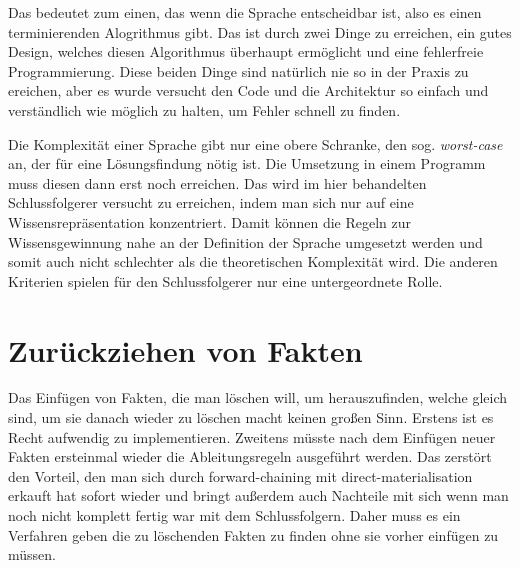 Das bedeutet zum einen, das wenn die Sprache entscheidbar ist, also es einen terminierenden Alogrithmus gibt. Das ist durch zwei Dinge zu erreichen, ein gutes Design, welches diesen Algorithmus überhaupt ermöglicht und eine fehlerfreie Programmierung. Diese beiden Dinge sind natürlich nie so in der Praxis zu ereichen, aber es wurde versucht den Code und die Architektur so einfach und verständlich wie möglich zu halten, um Fehler schnell zu finden.

Die Komplexität einer Sprache gibt nur eine obere Schranke, den sog. \emph{worst-case} an, der für eine Lösungsfindung nötig ist. Die Umsetzung in einem Programm muss diesen dann erst noch erreichen. Das wird im hier behandelten Schlussfolgerer versucht zu erreichen, indem man sich nur auf eine Wissensrepräsentation konzentriert. Damit können die Regeln zur Wissensgewinnung nahe an der Definition der Sprache umgesetzt werden und somit auch nicht schlechter als die theoretischen Komplexität wird.
Die anderen Kriterien spielen für den Schlussfolgerer nur eine untergeordnete Rolle.





\section{Zurückziehen von Fakten}
Das Einfügen von Fakten, die man löschen will, um herauszufinden, welche gleich sind, um sie danach wieder zu löschen macht keinen großen Sinn. Erstens ist es Recht aufwendig zu implementieren. Zweitens müsste nach dem Einfügen neuer Fakten ersteinmal wieder die Ableitungsregeln ausgeführt werden. Das zerstört den Vorteil, den man sich durch forward-chaining mit direct-materialisation erkauft hat sofort wieder und bringt außerdem auch Nachteile mit sich wenn man noch nicht komplett fertig war mit dem Schlussfolgern.
Daher muss es ein Verfahren geben die zu löschenden Fakten zu finden ohne sie vorher einfügen zu müssen.

